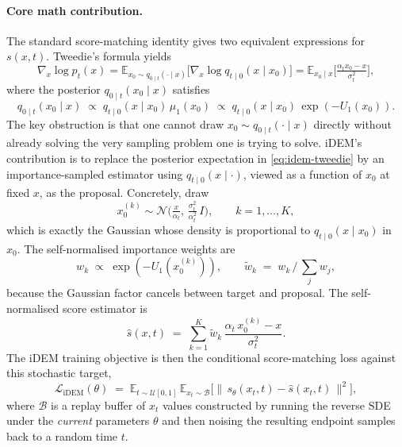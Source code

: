\documentclass[11pt,letterpaper]{article}
\newcommand{\E}{\mathbb{E}}
\theoremstyle{plain}
\begin{document}
\paragraph{Core math contribution.} The standard score-matching identity
gives two equivalent expressions for $s(x,t)$. Tweedie's formula yields
\begin{equation}
  \nabla_x \log p_t(x)
  = \E_{x_0\sim q_{0\mid t}(\cdot\mid x)}\!\big[\nabla_x \log q_{t\mid 0}(x\mid x_0)\big]
  = \E_{x_0\mid x}\!\Big[\tfrac{\alpha_t x_0 - x}{\sigma_t^2}\Big],
  \label{eq:idem-tweedie}
\end{equation}
where the posterior $q_{0\mid t}(x_0\mid x)$ satisfies
\begin{equation}
  q_{0\mid t}(x_0\mid x) \;\propto\; q_{t\mid 0}(x\mid x_0)\,\mu_1(x_0)
  \;\propto\; q_{t\mid 0}(x\mid x_0)\,\exp(-U_1(x_0)).
  \label{eq:idem-posterior}
\end{equation}
The key obstruction is that one cannot draw $x_0\sim q_{0\mid t}(\cdot\mid x)$
directly without already solving the very sampling problem one is trying to
solve. iDEM's contribution is to replace the posterior expectation in
\eqref{eq:idem-tweedie} by an importance-sampled estimator using
$q_{t\mid 0}(x\mid\cdot)$, viewed as a function of $x_0$ at fixed $x$, as the
proposal. Concretely, draw
\begin{equation}
  x_0^{(k)} \sim \mathcal N\!\Big(\tfrac{x}{\alpha_t},\,\tfrac{\sigma_t^2}{\alpha_t^2}\,I\Big),
  \qquad k=1,\dots,K,
  \label{eq:idem-proposal}
\end{equation}
which is exactly the Gaussian whose density is proportional to
$q_{t\mid 0}(x\mid x_0)$ in $x_0$. The self-normalised importance weights are
\begin{equation}
  w_k \;\propto\; \exp(-U_1(x_0^{(k)})),\qquad
  \tilde w_k \;=\; w_k\,\big/\,{\textstyle\sum_{j}}w_j,
  \label{eq:idem-weights}
\end{equation}
because the Gaussian factor cancels between target and proposal. The
self-normalised score estimator is
\begin{equation}
  \widehat s(x,t) \;=\; \sum_{k=1}^{K}\tilde w_k\,\frac{\alpha_t\,x_0^{(k)}-x}{\sigma_t^2}.
  \label{eq:idem-estimator}
\end{equation}
The iDEM training objective is then the conditional score-matching loss
against this stochastic target,
\begin{equation}
  \mathcal L_{\mathrm{iDEM}}(\theta) \;=\; \E_{t\sim\mathcal U[0,1]}\,\E_{x_t\sim\mathcal B}\!
  \Big[\big\|\,s_\theta(x_t,t) - \widehat s(x_t,t)\,\big\|^2\Big],
  \label{eq:idem-loss}
\end{equation}
where $\mathcal B$ is a replay buffer of $x_t$ values constructed by running
the reverse SDE under the \emph{current} parameters $\theta$ and then noising
the resulting endpoint samples back to a random time $t$.
\end{document}
